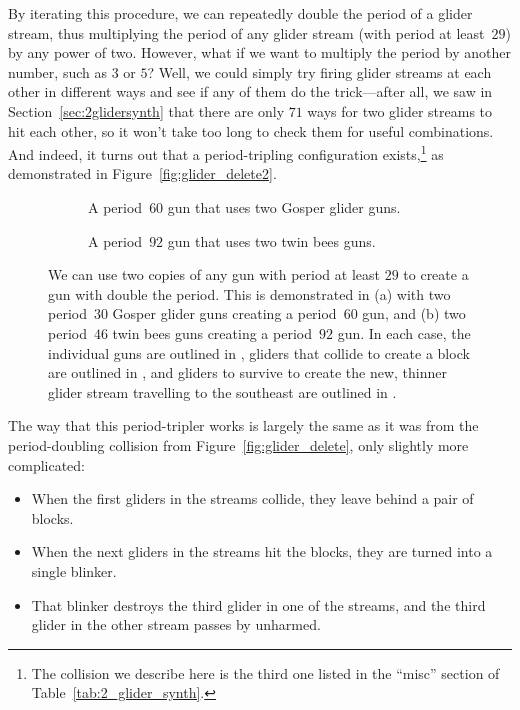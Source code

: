 By iterating this procedure, we can repeatedly double the period of a glider stream, thus multiplying the period of any glider stream (with period at least~$29$) by any power of two. However, what if we want to multiply the period by another number, such as $3$ or $5$? Well, we could simply try firing glider streams at each other in different ways and see if any of them do the trick---after all, we saw in Section~\ref{sec:2glidersynth} that there are only $71$ ways for two glider streams to hit each other, so it won't take too long to check them for useful combinations. And indeed, it turns out that a period-tripling configuration exists,\footnote{The collision we describe here is the third one listed in the ``misc'' section of Table~\ref{tab:2_glider_synth}.} as demonstrated in Figure~\ref{fig:glider_delete2}.

\begin{figure}[!htb]
	\centering
	\begin{subfigure}{.48\textwidth}
		\centering
		\caption{A period~$60$ gun that uses two Gosper glider guns.}
		\label{fig:p60_gun}
	\end{subfigure} \hfill %
	\begin{subfigure}{.49\textwidth}
		\centering
		\caption{A period~$92$ gun that uses two twin bees guns.}
		\label{fig:p92_gun}
	\end{subfigure}
	\caption{We can use two copies of any gun with period at least $29$ to create a gun with double the period. This is demonstrated in (a) with two period~$30$ Gosper glider guns creating a period~$60$ gun, and (b) two period~$46$ twin bees guns creating a period~$92$ gun. In each case, the individual guns are outlined in , gliders that collide to create a block are outlined in , and gliders to survive to create the new, thinner glider stream travelling to the southeast are outlined in .}\label{fig:guns_doubled_period}
\end{figure}

The way that this period-tripler works is largely the same as it was from the period-doubling collision from Figure~\ref{fig:glider_delete}, only slightly more complicated:\smallskip

\begin{itemize}
	\item When the first gliders in the streams collide, they leave behind a pair of blocks.\smallskip
	
	\item When the next gliders in the streams hit the blocks, they are turned into a single blinker.\smallskip
	
	\item That blinker destroys the third glider in one of the streams, and the third glider in the other stream passes by unharmed.\smallskip
\end{itemize}

